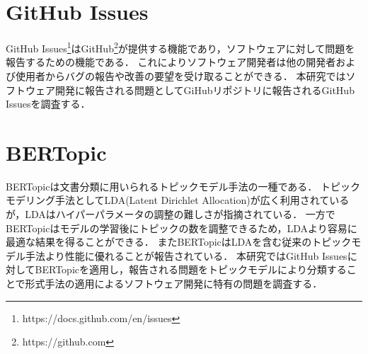 \documentclass[main]{subfiles}
\begin{document}
\section{GitHub Issues}

GitHub Issues\footnote{https://docs.github.com/en/issues}はGitHub\footnote{https://github.com}が提供する機能であり，ソフトウェアに対して問題を報告するための機能である．
これによりソフトウェア開発者は他の開発者および使用者からバグの報告や改善の要望を受け取ることができる．
本研究ではソフトウェア開発に報告される問題としてGiHubリポジトリに報告されるGitHub Issuesを調査する．

\section{BERTopic}

BERTopicは文書分類に用いられるトピックモデル手法の一種である．
トピックモデリング手法としてLDA(Latent Dirichlet Allocation)が広く利用されているが，LDAはハイパーパラメータの調整の難しさが指摘されている\cite{panichella:2021}．
一方でBERTopicはモデルの学習後にトピックの数を調整できるため，LDAより容易に最適な結果を得ることができる．
またBERTopicはLDAを含む従来のトピックモデル手法より性能に優れることが報告されている\cite{egger:2022}．
本研究ではGitHub Issuesに対してBERTopicを適用し，報告される問題をトピックモデルにより分類することで形式手法の適用によるソフトウェア開発に特有の問題を調査する．
\end{document}
